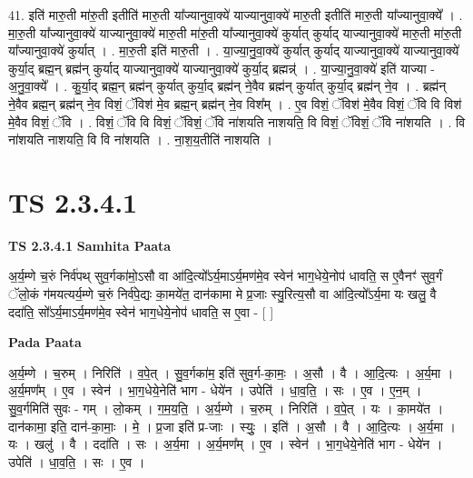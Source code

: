\documentclass[17pt]{extarticle}
\begin{document}
41. इति॑ मारु॒ती मा॑रु॒ती इतीति॑ मारु॒ती या᳚ज्यानुवा॒क्ये॑ याज्यानुवा॒क्ये॑ मारु॒ती इतीति॑ मारु॒ती या᳚ज्यानुवा॒क्ये᳚ । . मा॒रु॒ती या᳚ज्यानुवा॒क्ये॑ याज्यानुवा॒क्ये॑ मारु॒ती मा॑रु॒ती या᳚ज्यानुवा॒क्ये॑ कुर्यात् कुर्याद् याज्यानुवा॒क्ये॑ मारु॒ती मा॑रु॒ती या᳚ज्यानुवा॒क्ये॑ कुर्यात् । . मा॒रु॒ती इति॑ मारु॒ती । . या॒ज्या॒नु॒वा॒क्ये॑ कुर्यात् कुर्याद् याज्यानुवा॒क्ये॑ याज्यानुवा॒क्ये॑ कुर्या॒द् ब्रह्म॒न् ब्रह्म॑न् कुर्याद् याज्यानुवा॒क्ये॑ याज्यानुवा॒क्ये॑ कुर्या॒द् ब्रह्मन्न्॑ । . या॒ज्या॒नु॒वा॒क्ये॑ इति॑ याज्या - अ॒नु॒वा॒क्ये᳚ । . कु॒र्या॒द् ब्रह्म॒न् ब्रह्म॑न् कुर्यात् कुर्या॒द् ब्रह्म॑न् ने॒वैव ब्रह्म॑न् कुर्यात् कुर्या॒द् ब्रह्म॑न् ने॒व । . ब्रह्म॑न् ने॒वैव ब्रह्म॒न् ब्रह्म॑न् ने॒व विशं॒ ॅविश॑ मे॒व ब्रह्म॒न् ब्रह्म॑न् ने॒व विश᳚म् । . ए॒व विशं॒ ॅविश॑ मे॒वैव विशं॒ ॅवि वि विश॑ मे॒वैव विशं॒ ॅवि । . विशं॒ ॅवि वि विशं॒ ॅविशं॒ ॅवि ना॑शयति नाशयति॒ वि विशं॒ ॅविशं॒ ॅवि ना॑शयति । . वि ना॑शयति नाशयति॒ वि वि ना॑शयति । . ना॒श॒य॒तीति॑ नाशयति । \newline
\pagebreak
{}
\section*{ TS 2.3.4.1 }

\textbf{TS 2.3.4.1 } \newline
\textbf{Samhita Paata} \newline

अ॒र्य॒म्णे च॒रुं निर्व॑पथ् सुव॒र्गका॑मो॒ऽसौ वा आ॑दि॒त्यो᳚ऽर्य॒माऽर्य॒मण॑मे॒व स्वेन॑ भाग॒धेये॒नोप॑ धावति॒ स ए॒वैनꣳ॑ सुव॒र्गं ॅलो॒कं ग॑मयत्यर्य॒म्णे च॒रुं निर्व॑पे॒द्यः का॒मये॑त॒ दान॑कामा मे प्र॒जाः स्यु॒रित्य॒सौ वा आ॑दि॒त्यो᳚ऽर्य॒मा यः खलु॒ वै ददा॑ति॒ सो᳚ऽर्य॒माऽर्य॒मण॑मे॒व स्वेन॑ भाग॒धेये॒नोप॑ धावति॒ स ए॒वा - [  ] \newline

\textbf{Pada Paata} \newline

अ॒र्य॒म्णे । च॒रुम् । निरिति॑ । व॒पे॒त् । सु॒व॒र्गका॑म॒ इति॑ सुव॒र्ग-का॒मः॒ । अ॒सौ । वै । आ॒दि॒त्यः । अ॒र्य॒मा । अ॒र्य॒मण᳚म् । ए॒व । स्वेन॑ । भा॒ग॒धेये॒नेति॑ भाग - धेये॑न । उपेति॑ । धा॒व॒ति॒ । सः । ए॒व । ए॒न॒म् । सु॒व॒र्गमिति॑ सुवः - गम् । लो॒कम् । ग॒म॒य॒ति॒ । अ॒र्य॒म्णे । च॒रुम् । निरिति॑ । व॒पे॒त् । यः । का॒मये॑त । दान॑कामा॒ इति॒ दान॑-का॒माः॒ । मे॒ । प्र॒जा इति॑ प्र-जाः । स्युः॒ । इति॑ । अ॒सौ । वै । आ॒दि॒त्यः । अ॒र्य॒मा । यः । खलु॑ । वै । ददा॑ति । सः । अ॒र्य॒मा । अ॒र्य॒मण᳚म् । ए॒व । स्वेन॑ । भा॒ग॒धेये॒नेति॑ भाग - धेये॑न । उपेति॑ । धा॒व॒ति॒ । सः । ए॒व ।  \newline
\end{document}
